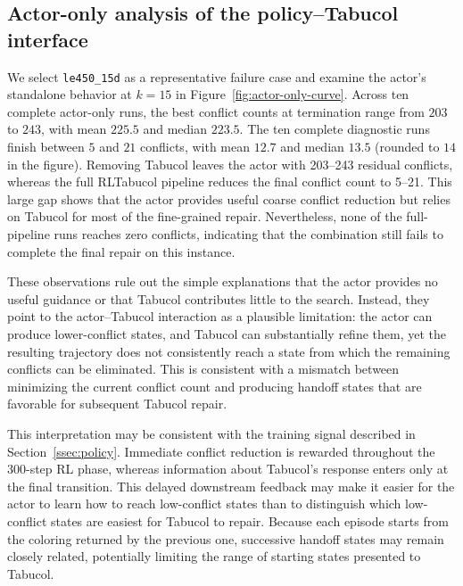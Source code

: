 \begin{table}[t]
\centering
\caption{Comparison among Pure Tabucol, RLTabucol, and the random-policy baseline RLTabucol$_0$. Time reports best / mean wall-clock seconds over successful runs only. Bold $k_{\rm best}$ values are the lowest per row, including ties. Best and mean times are compared and bolded independently only among methods attaining the row-minimum color budget.}
\label{tab:rltabucol-default}
\setlength{\tabcolsep}{2.5pt}
\resizebox{\textwidth}{!}{}
\end{table}

\subsection{Actor-only analysis of the policy--Tabucol interface}
\label{ssec:res-actor}

We select \texttt{le450\_15d} as a representative failure case and examine
the actor's standalone behavior at $k=15$ in
Figure~\ref{fig:actor-only-curve}. Across ten complete actor-only runs, the best conflict counts at termination range from $203$ to $243$, with mean $225.5$ and median $223.5$. The ten complete diagnostic runs finish between $5$ and $21$ conflicts, with mean $12.7$ and median $13.5$ (rounded to $14$ in the figure). Removing Tabucol leaves the actor with 203--243 residual conflicts,
whereas the full RLTabucol pipeline reduces the final conflict count to
5--21. This large gap shows that the actor provides useful coarse
conflict reduction but relies on Tabucol for most of the fine-grained
repair. Nevertheless, none of the full-pipeline runs reaches zero
conflicts, indicating that the combination still fails to complete the
final repair on this instance.

These observations rule out the simple explanations that the actor
provides no useful guidance or that Tabucol contributes little to the
search. Instead, they point to the actor--Tabucol interaction as a
plausible limitation: the actor can produce lower-conflict states, and
Tabucol can substantially refine them, yet the resulting trajectory does
not consistently reach a state from which the remaining conflicts can be
eliminated. This is consistent with a mismatch between minimizing the
current conflict count and producing handoff states that are favorable
for subsequent Tabucol repair.

This interpretation may be consistent with the training signal described in Section~\ref{ssec:policy}. Immediate conflict reduction is rewarded throughout the $300$-step RL phase, whereas information about Tabucol's response enters only at the final transition. This delayed downstream feedback may make it easier for the actor to learn how to reach low-conflict states than to distinguish which low-conflict states are easiest for Tabucol to repair. Because each episode starts from the coloring returned by the previous one, successive handoff states may remain closely related, potentially limiting the range of starting states presented to Tabucol.

